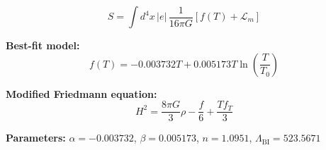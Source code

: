 
\begin{equation}
  S = \int d^4x \, |e| \, \frac{1}{16\pi G} \left[ f(T) + \mathcal{L}_m \right]
\end{equation}

\textbf{Best-fit model:}
\begin{equation}
  f(T) = -0.003732 T + 0.005173 T \ln\!\left(\frac{T}{T_0}\right)
\end{equation}

\textbf{Modified Friedmann equation:}
\begin{equation}
  H^2 = \frac{8\pi G}{3} \rho - \frac{f}{6} + \frac{T f_T}{3}
\end{equation}

\textbf{Parameters:}
$\alpha = -0.003732$, \quad
$\beta = 0.005173$, \quad
$n = 1.0951$, \quad
$\Lambda_{\text{BI}} = 523.5671$